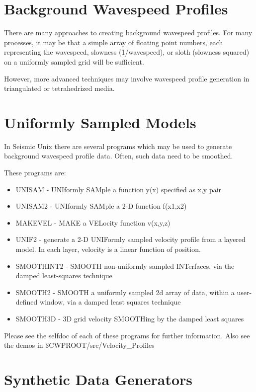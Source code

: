 {{{{{{{\section{Background Wavespeed Profiles}

There are many approaches to creating background wavespeed profiles.
For many processes, it may be that a simple array of floating point
numbers, each representing the wavespeed, slowness (1/wavespeed), or
sloth (slowness squared) on a uniformly sampled grid will be sufficient.

However, more advanced techniques may involve wavespeed profile generation
in triangulated or tetrahedrized media.

\section{Uniformly Sampled Models}
In Seismic Unix there are several programs which may be used to generate
background wavespeed profile data. Often, such data need to be
smoothed.

These programs are:
\begin{itemize}
\item UNISAM - UNIformly SAMple a function y(x) specified as x,y pair
\item UNISAM2 - UNIformly SAMple a 2-D function f(x1,x2)
\item MAKEVEL - MAKE a VELocity function v(x,y,z)
\item UNIF2 - generate a 2-D UNIFormly sampled velocity profile from a 
layered model. In each layer, velocity is a linear function of position.
\item SMOOTHINT2 - SMOOTH non-uniformly sampled INTerfaces, via the damped
least-squares technique 
\item SMOOTH2 - SMOOTH a uniformly sampled 2d array of data, within a user-
defined window, via a damped least squares technique
\item SMOOTH3D - 3D grid velocity SMOOTHing by the damped least squares 
\end{itemize}

Please see the selfdoc of each of these programs for further information.
Also see the demos in \$CWPROOT/src/Velocity\_Profiles

\section{Synthetic Data Generators}

}}}}}}}
